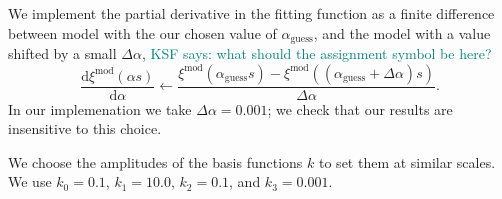 \documentclass[modern]{aastex62}
\newcommand{\dd}{\mathrm{d}}
\newcommand{\KSF}[1]{\textcolor{teal}{KSF says: #1}}
\begin{document}
We implement the partial derivative in the fitting function as a finite difference between model with the our chosen value of $\alpha_\mathrm{guess}$, and the model with a value shifted by a small $\Delta \alpha$,
\KSF{what should the assignment symbol be here?}
\begin{equation}
    \frac{\dd \xi^\mathrm{mod}(\alpha s)}{\dd \alpha} \leftarrow \frac{\xi^\mathrm{mod}(\alpha_\mathrm{guess} s) - \xi^\mathrm{mod}((\alpha_\mathrm{guess} + \Delta \alpha)s)}{\Delta \alpha}.
\end{equation}
In our implemenation we take $\Delta \alpha = 0.001$; we check that our results are insensitive to this choice.

We choose the amplitudes of the basis functions $k$ to set them at similar scales.
We use $k_0=0.1$, $k_1=10.0$, $k_2=0.1$, and $k_3=0.001$.

% 
%

\end{document}
